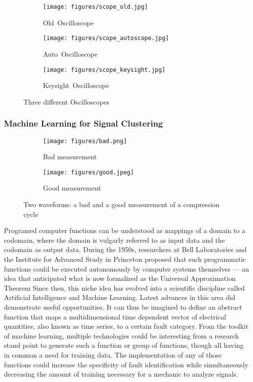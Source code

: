 \begin{figure}[ht]
  \centering

  \begin{subfigure}[b]{0.3\linewidth}
    \centering
    \texttt{[image: figures/scope\_old.jpg]}
    \caption{\mbox{Old Oscilloscope}}
  \end{subfigure}
  \hfill
  \begin{subfigure}[b]{0.3\linewidth}
    \centering
    \texttt{[image: figures/scope\_autoscope.jpg]}
    \caption{\mbox{Auto Oscilloscope}}
  \end{subfigure}
  \hfill
  \begin{subfigure}[b]{0.3\linewidth}
    \centering
    \texttt{[image: figures/scope\_keysight.jpg]}
    \caption{\mbox{Keysight Oscilloscope}}
  \end{subfigure}

  \caption{Three different Oscilloscopes}
  \label{fig:scopes}
\end{figure}


\subsubsection{Machine Learning for Signal Clustering}
\begin{figure}[ht]
  \centering
  
  \begin{subfigure}[b]{0.48\linewidth}
    \texttt{[image: figures/bad.png]}
    \caption{Bad measurement}
  \end{subfigure}
  \hfill
  \begin{subfigure}[b]{0.48\linewidth}
    \texttt{[image: figures/good.jpeg]}
    \caption{Good measurement}
  \end{subfigure}

  \caption{Two waveforms: a bad and a good measurement of a compression cycle}
  \label{fig:waveforms_good_bad}
\end{figure}
Programed computer functions can be understood as mappings of a domain to a codomain, where the domain is vulgarly referred to as input data and the codomain as output data. 
During the 1950s, researchers at Bell Laboratories and the Institute for Advanced Study in Princeton proposed that such programmatic functions could be executed autonomously by computer systems themselves 
— an idea that anticipated what is now formalized as the Universal Approximation Theorem Since then, this niche idea has evolved into a scientific discipline called Artificial Intelligence and Machine Learning. 
Latest advances in this area did demonstrate useful opportunities. 
It can thus be imagined to define an abstract function that maps a multidimensional time dependent vector of electrical quantities, also known as time series, to a certain fault category. 
From the toolkit of machine learning, multiple technologies could be interesting from a research stand point to generate such a function or group of functions, though all having in common a need for training data. 
The implementation of any of those functions could increase the specificity of fault identification while simultaneously decreasing the amount of training necessary for a mechanic to analyze signals.

